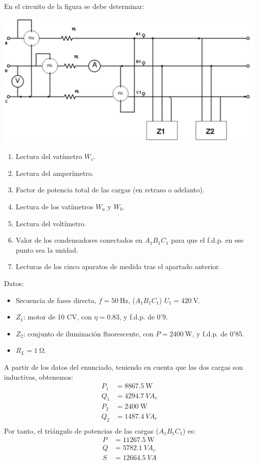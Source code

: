 \documentclass[12pt]{article}
\begin{document}
En el circuito de la figura se debe determinar:

\begin{center}
  \includegraphics[scale=0.4]{figs/FiguraBT3.pdf}
\end{center}

\begin{enumerate}
\item Lectura del vatímetro $W_c$.
\item Lectura del amperímetro.
\item Factor de potencia total de las cargas (en retraso o
  adelanto).
\item Lectura de los vatímetros $W_a$ y $W_b$.
\item Lectura del voltímetro.
\item Valor de los condensadores conectados en $A_1B_1C_1$ para
  que el f.d.p. en ese punto sea la unidad.
\item Lecturas de los cinco aparatos de medida tras el apartado
  anterior.
\end{enumerate}

Datos:
\begin{itemize}
\item Secuencia de fases directa, $f = \SI{50}{\hertz}$, ($A_1B_1C_1$)
  $U_1 = \SI{420}{\volt}$.
\item $Z_1$: motor de 10 CV, con $\eta = 0.83$, y f.d.p. de 0'9.
\item $Z_2$: conjunto de iluminación fluorescente, con
  $P = \SI{2400}{\watt}$, y f.d.p. de 0'85.
\item $R_L = \SI{1}{\ohm}$.
\end{itemize}

\noindent\hrulefill

A partir de los datos del enunciado, teniendo en cuenta que las dos
cargas son inductivas, obtenemos:
\begin{align*}
  P_1 &= \SI{8867.5}{\watt}\\
  Q_1 &= \SI{4294.7}{VA}_r\\
  P_2 &= \SI{2400}{\watt}\\
  Q_2 &= \SI{1487.4}{VA}_r\\
\end{align*}
Por tanto, el triángulo de potencias de las cargas ($A_1B_1C_1$) es:
\begin{align*}
  P &= \SI{11267.5}{\watt}\\
  Q &= \SI{5782.1}{VA}_r\\
  S &= \SI{12664.5}{VA}\\
\end{align*}
\end{document}

